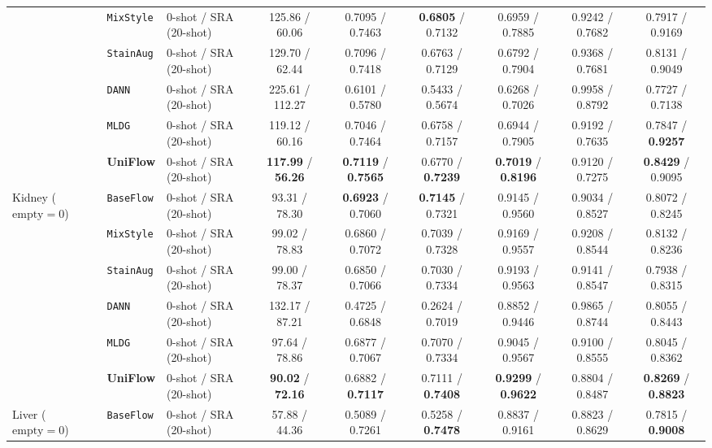 \documentclass[journal]{IEEEtran}
\newcommand{\methodname}{UniFlow}
\begin{document}
\begin{table}[!t]
{\begin{tabular}{lllcccccc}
& \texttt{MixStyle} & 0-shot / SRA (20-shot) & 125.86 / 60.06 & 0.7095 / 0.7463 & \textbf{0.6805} / 0.7132 & 0.6959 / 0.7885 & 0.9242 / 0.7682 & 0.7917 / 0.9169 \\
& \texttt{StainAug} & 0-shot / SRA (20-shot) & 129.70 / 62.44 & 0.7096 / 0.7418 & 0.6763 / 0.7129 & 0.6792 / 0.7904 & 0.9368 / 0.7681 & 0.8131 / 0.9049 \\
& \texttt{DANN} & 0-shot / SRA (20-shot) & 225.61 / 112.27 & 0.6101 / 0.5780 & 0.5433 / 0.5674 & 0.6268 / 0.7026 & 0.9958 / 0.8792 & 0.7727 / 0.7138 \\
& \texttt{MLDG} & 0-shot / SRA (20-shot) & 119.12 / 60.16 & 0.7046 / 0.7464 & 0.6758 / 0.7157 & 0.6944 / 0.7905 & 0.9192 / 0.7635 & 0.7847 / \textbf{0.9257} \\
& \textbf{\methodname{}} & 0-shot / SRA (20-shot) & \textbf{117.99} / \textbf{56.26} & \textbf{0.7119} / \textbf{0.7565} & 0.6770 / \textbf{0.7239} & \textbf{0.7019} / \textbf{0.8196} & 0.9120 / 0.7275 & \textbf{0.8429} / 0.9095 \\
\midrule
\multirow{6}{*}{Kidney ($\text{empty}=0$)}
& \texttt{BaseFlow} & 0-shot / SRA (20-shot) & 93.31 / 78.30 & \textbf{0.6923} / 0.7060 & \textbf{0.7145} / 0.7321 & 0.9145 / 0.9560 & 0.9034 / 0.8527 & 0.8072 / 0.8245 \\
& \texttt{MixStyle} & 0-shot / SRA (20-shot) & 99.02 / 78.83 & 0.6860 / 0.7072 & 0.7039 / 0.7328 & 0.9169 / 0.9557 & 0.9208 / 0.8544 & 0.8132 / 0.8236 \\
& \texttt{StainAug} & 0-shot / SRA (20-shot) & 99.00 / 78.37 & 0.6850 / 0.7066 & 0.7030 / 0.7334 & 0.9193 / 0.9563 & 0.9141 / 0.8547 & 0.7938 / 0.8315 \\
& \texttt{DANN} & 0-shot / SRA (20-shot) & 132.17 / 87.21 & 0.4725 / 0.6848 & 0.2624 / 0.7019 & 0.8852 / 0.9446 & 0.9865 / 0.8744 & 0.8055 / 0.8443 \\
& \texttt{MLDG} & 0-shot / SRA (20-shot) & 97.64 / 78.86 & 0.6877 / 0.7067 & 0.7070 / 0.7334 & 0.9045 / 0.9567 & 0.9100 / 0.8555 & 0.8045 / 0.8362 \\
& \textbf{\methodname{}} & 0-shot / SRA (20-shot) & \textbf{90.02} / \textbf{72.16} & 0.6882 / \textbf{0.7117} & 0.7111 / \textbf{0.7408} & \textbf{0.9299} / \textbf{0.9622} & 0.8804 / 0.8487 & \textbf{0.8269} / \textbf{0.8823} \\
\midrule
\multirow{6}{*}{Liver ($\text{empty}=0$)}
& \texttt{BaseFlow} & 0-shot / SRA (20-shot) & 57.88 / 44.36 & 0.5089 / 0.7261 & 0.5258 / \textbf{0.7478} & 0.8837 / 0.9161 & 0.8823 / 0.8629 & 0.7815 / \textbf{0.9008} \\

\end{tabular}}
\end{table}
\end{document}
